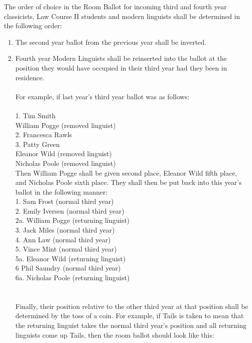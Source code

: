 \npara \label{AppP:RoomIncomingThird} The order of choice in the Room Ballot for incoming third and fourth year classicists, Law Course II students and modern linguists shall be determined in the following order:
\begin{enumerate}
\item The second year ballot from the previous year shall be inverted.
\item Fourth year Modern Linguists shall be reinserted into the ballot at the position they would have occupied in their third year had they been in residence. \\ \\
For example, if last year's third year ballot was as follows:\\ \\
1. Tim Smith\\
William Pogge (removed linguist)\\
2. Francesca Rawls\\
3. Patty Green\\
Eleanor Wild (removed linguist)\\
Nicholas Poole (removed linguist)\\
Then William Pogge shall be given second place, Eleanor Wild fifth place, and Nicholas Poole sixth place. They shall then be put back into this year's ballot in the following manner:\\
1.	Sam Frost (normal third year)\\
2.	Emily Iversen (normal third year)\\
2a. William Pogge (returning linguist)\\
3.	Jack Miles (normal third year)\\
4.	Ann Law (normal third year)\\
5.	Vince Mint (normal third year)\\
5a. Eleanor Wild (returning linguist)\\
6	Phil Saundry (normal third year)\\
6a. Nicholas Poole (returning linguist)\\ \\ \\
Finally, their position relative to the other third year at that position shall be determined by the toss of a coin. For example, if Tails is taken to mean that the returning linguist takes the normal third year's position and all returning linguists come up Tails, then the room ballot should look like this:\\ \\

\end{enumerate}
